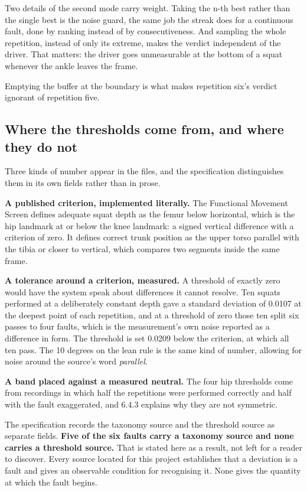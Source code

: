 Two details of the second mode carry weight. Taking the n-th best rather than the single best is the noise guard, the same job the streak does for a continuous fault, done by ranking instead of by consecutiveness. And sampling the whole repetition, instead of only its extreme, makes the verdict independent of the driver. That matters: the driver goes unmeasurable at the bottom of a squat whenever the ankle leaves the frame.

Emptying the buffer at the boundary is what makes repetition six's verdict ignorant of repetition five.

\subsection{Where the thresholds come from, and where they do not}
\label{sec:6.4.2}

Three kinds of number appear in the files, and the specification distinguishes them in its own fields rather than in prose.

\textbf{A published criterion, implemented literally.} The Functional Movement Screen defines adequate squat depth as the femur below horizontal, which is the hip landmark at or below the knee landmark: a signed vertical difference with a criterion of zero. It defines correct trunk position as the upper torso parallel with the tibia or closer to vertical, which compares two segments inside the same frame.

\textbf{A tolerance around a criterion, measured.} A threshold of exactly zero would have the system speak about differences it cannot resolve. Ten squats performed at a deliberately constant depth gave a standard deviation of 0.0107 at the deepest point of each repetition, and at a threshold of zero those ten split six passes to four faults, which is the measurement's own noise reported as a difference in form. The threshold is set 0.0209 below the criterion, at which all ten pass. The 10 degrees on the lean rule is the same kind of number, allowing for noise around the source's word \textit{parallel}.

\textbf{A band placed against a measured neutral.} The four hip thresholds come from recordings in which half the repetitions were performed correctly and half with the fault exaggerated, and 6.4.3 explains why they are not symmetric.

The specification records the taxonomy source and the threshold source as separate fields. \textbf{Five of the six faults carry a taxonomy source and none carries a threshold source.} That is stated here as a result, not left for a reader to discover. Every source located for this project establishes that a deviation is a fault and gives an observable condition for recognising it. None gives the quantity at which the fault begins.

